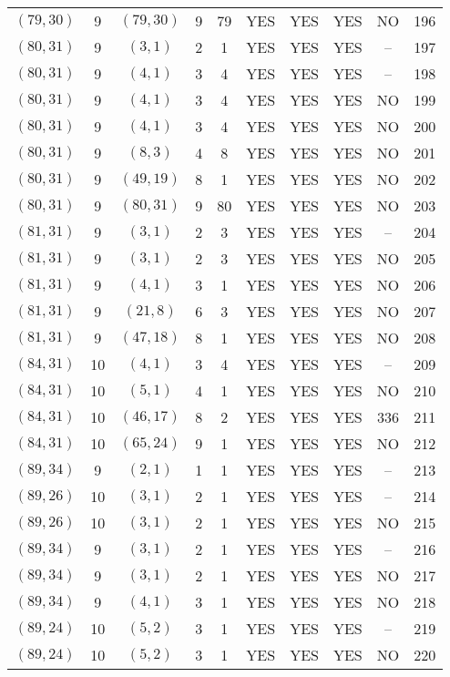 \begin{longtable}{|c|c|c|c|c|c|c|c|c|c|}
$(79, 30)$ & 9 & $(79, 30)$ & 9 & 79 & YES & YES & YES & NO & 196\\
$(80, 31)$ & 9 & $(3, 1)$ & 2 & 1 & YES & YES & YES & -- & 197\\
$(80, 31)$ & 9 & $(4, 1)$ & 3 & 4 & YES & YES & YES & -- & 198\\
$(80, 31)$ & 9 & $(4, 1)$ & 3 & 4 & YES & YES & YES & NO & 199\\
$(80, 31)$ & 9 & $(4, 1)$ & 3 & 4 & YES & YES & YES & NO & 200\\
$(80, 31)$ & 9 & $(8, 3)$ & 4 & 8 & YES & YES & YES & NO & 201\\
$(80, 31)$ & 9 & $(49, 19)$ & 8 & 1 & YES & YES & YES & NO & 202\\
$(80, 31)$ & 9 & $(80, 31)$ & 9 & 80 & YES & YES & YES & NO & 203\\
$(81, 31)$ & 9 & $(3, 1)$ & 2 & 3 & YES & YES & YES & -- & 204\\
$(81, 31)$ & 9 & $(3, 1)$ & 2 & 3 & YES & YES & YES & NO & 205\\
$(81, 31)$ & 9 & $(4, 1)$ & 3 & 1 & YES & YES & YES & NO & 206\\
$(81, 31)$ & 9 & $(21, 8)$ & 6 & 3 & YES & YES & YES & NO & 207\\
$(81, 31)$ & 9 & $(47, 18)$ & 8 & 1 & YES & YES & YES & NO & 208\\
$(84, 31)$ & 10 & $(4, 1)$ & 3 & 4 & YES & YES & YES & -- & 209\\
$(84, 31)$ & 10 & $(5, 1)$ & 4 & 1 & YES & YES & YES & NO & 210\\
$(84, 31)$ & 10 & $(46, 17)$ & 8 & 2 & YES & YES & YES & 336 & 211\\
$(84, 31)$ & 10 & $(65, 24)$ & 9 & 1 & YES & YES & YES & NO & 212\\
$(89, 34)$ & 9 & $(2, 1)$ & 1 & 1 & YES & YES & YES & -- & 213\\
$(89, 26)$ & 10 & $(3, 1)$ & 2 & 1 & YES & YES & YES & -- & 214\\
$(89, 26)$ & 10 & $(3, 1)$ & 2 & 1 & YES & YES & YES & NO & 215\\
$(89, 34)$ & 9 & $(3, 1)$ & 2 & 1 & YES & YES & YES & -- & 216\\
$(89, 34)$ & 9 & $(3, 1)$ & 2 & 1 & YES & YES & YES & NO & 217\\
$(89, 34)$ & 9 & $(4, 1)$ & 3 & 1 & YES & YES & YES & NO & 218\\
$(89, 24)$ & 10 & $(5, 2)$ & 3 & 1 & YES & YES & YES & -- & 219\\
$(89, 24)$ & 10 & $(5, 2)$ & 3 & 1 & YES & YES & YES & NO & 220\\

\end{longtable}
